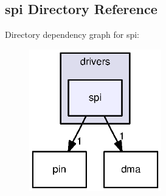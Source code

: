 \subsection{spi Directory Reference}
\label{dir_f6361f2db12d9411a4cc3a9f4eb7f57b}
Directory dependency graph for spi\-:
\nopagebreak
\begin{figure}[H]
\begin{center}
\leavevmode
\includegraphics[width=163pt]{dir_f6361f2db12d9411a4cc3a9f4eb7f57b_dep}
\end{center}
\end{figure}

